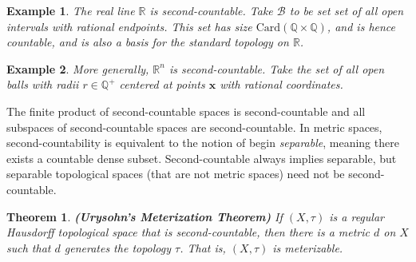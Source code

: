 \documentclass{article}
\theoremstyle{plain}
\newtheorem{theorem}{Theorem}[section]
\theoremstyle{normal}
\newtheorem{example}{Example}[section]
\begin{document}
        \begin{example}
            The real line $\mathbb{R}$ is second-countable. Take $\mathcal{B}$
            to be set set of all open intervals with rational endpoints. This
            set has size $\textrm{Card}(\mathbb{Q}\times\mathbb{Q})$,
            and is hence countable, and is also a basis for the standard
            topology on $\mathbb{R}$.
        \end{example}
        \begin{example}
            More generally, $\mathbb{R}^{n}$ is second-countable. Take the set
            of all open balls with radii $r\in\mathbb{Q}^{+}$ centered at
            points $\mathbf{x}$ with rational coordinates.
        \end{example}
        The finite product of second-countable spaces is second-countable
        and all subspaces of second-countable spaces are second-countable.
        In metric spaces, second-countability is equivalent to the notion of
        begin \textit{separable}, meaning there exists a countable dense
        subset. Second-countable always implies separable, but separable
        topological spaces (that are not metric spaces) need not be
        second-countable.
        \begin{theorem}{\textbf{(Urysohn's Meterization Theorem)}}
            If $(X,\tau)$ is a regular Hausdorff topological space that is
            second-countable, then there is a metric $d$ on $X$ such that
            $d$ generates the topology $\tau$. That is, $(X,\tau)$ is
            meterizable.
        \end{theorem}
\end{document}
